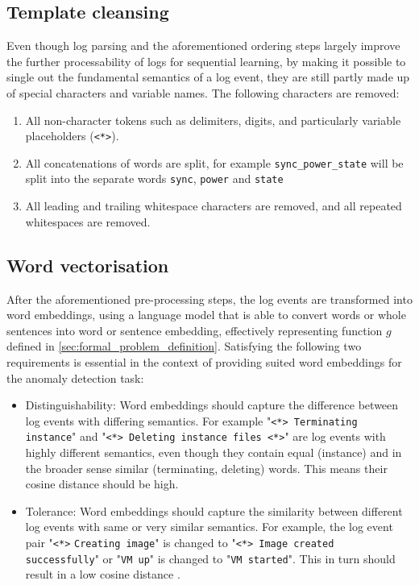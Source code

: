 \subsection{Template cleansing \label{template_cleansing}}
Even though log parsing and the aforementioned ordering steps largely improve the further processability of logs for sequential learning, by making it possible to single out the fundamental semantics of a log event, they are still partly made up of special characters and variable names. The following characters are removed:
\begin{enumerate}
	\item All non-character tokens such as delimiters, digits, and particularly variable placeholders (\verb!<*>!).
	\item All concatenations of words are split, for example \verb!sync_power_state! will be split into the separate words \verb!sync!, \verb!power! and \verb!state!
	\item All leading and trailing whitespace characters are removed, and all repeated whitespaces are removed.
\end{enumerate}

\subsection{Word vectorisation \label{sec:word_vectorization}}
After the aforementioned pre-processing steps, the log events are transformed into word embeddings, using a language model that is able to convert words or whole sentences into word or sentence embedding, effectively representing function $g$ defined in \ref{sec:formal_problem_definition}. Satisfying the following two requirements is essential in the context of providing suited word embeddings for the anomaly detection task:
\begin{itemize}
	\item Distinguishability: Word embeddings should capture the difference between log events with differing semantics. For example "\verb!<*> Terminating instance!" and "\verb!<*> Deleting instance files <*>!" are log events with highly different semantics, even though they contain equal (instance) and in the broader sense similar (terminating, deleting) words. This means their cosine distance should be high.
	\item Tolerance: Word embeddings should capture the similarity between different log events with same or very similar semantics. For example, the log event pair "\verb!<*>! \verb!Creating image!" is changed to "\verb!<*> Image created successfully!" or "\verb!VM up!" is changed to "\verb!VM started!". This in turn should result in a low cosine distance \cite{zhang2019robust}.
\end{itemize}

